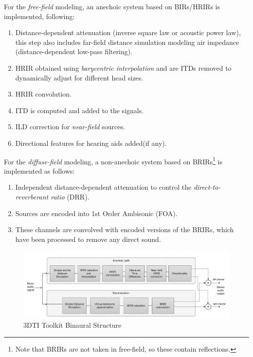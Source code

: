For the \textit{free-field} modeling, an anechoic system based on BIRs/HRIRs is implemented, following:


\begin{enumerate}
    \item Distance-dependent attenuation (inverse square law or acoustic power law), this step also includes far-field distance simulation modeling air impedance (distance-dependent low-pass filtering).
    \item HRIR obtained using \textit{barycentric interpolation} and are ITDs removed to dynamically adjust for different head sizes.
    \item HRIR convolution.
    \item ITD is computed and added to the signals.
    \item ILD correction for \textit{near-field} sources.
    \item Directional features for hearing aids added(if any).
\end{enumerate}

For the \textit{diffuse-field} modeling, a non-anechoic system based on BRIRs\footnote{Note that BRIRs are not taken in free-field, so these contain reflections.} is implemented as follows:

\begin{enumerate}
    \item Independent distance-dependent attenuation to control the \textit{direct-to-reverberant ratio} (DRR). 
    \item Sources are encoded into 1st Order Ambisonic (FOA).
    \item These channels are convolved with encoded versions of the BRIRs, which have been processed to remove any direct sound.
\end{enumerate}

\begin{figure}[ht!]%
\centering
\includegraphics[width=1.0\textwidth]{img/3dti-chain.png} 
\caption{3DTI Toolkit Binaural Structure \cite{cuevas20193d}}
\label{fig:3dti-chain}
\end{figure}

